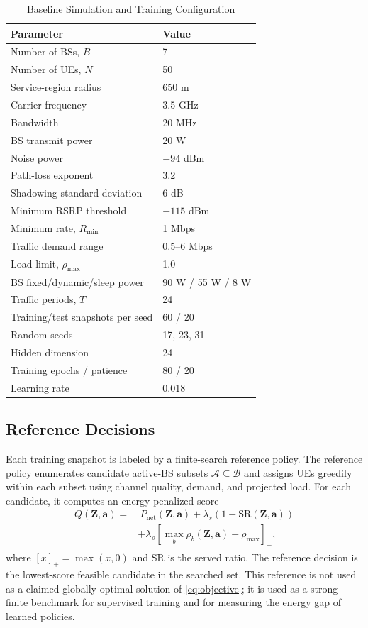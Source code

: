 \documentclass[journal]{IEEEtran}
\begin{document}
\begin{table}[!t]
\caption{Baseline Simulation and Training Configuration}
\label{tab:sim_params}
\centering
\begin{tabular}{ll}
\toprule
Parameter & Value \\
\midrule
Number of BSs, $B$ & 7 \\
Number of UEs, $N$ & 50 \\
Service-region radius & 650 m \\
Carrier frequency & 3.5 GHz \\
Bandwidth & 20 MHz \\
BS transmit power & 20 W \\
Noise power & $-94$ dBm \\
Path-loss exponent & 3.2 \\
Shadowing standard deviation & 6 dB \\
Minimum RSRP threshold & $-115$ dBm \\
Minimum rate, $R_{\min}$ & 1 Mbps \\
Traffic demand range & 0.5--6 Mbps \\
Load limit, $\rho_{\max}$ & 1.0 \\
BS fixed/dynamic/sleep power & 90 W / 55 W / 8 W \\
Traffic periods, $T$ & 24 \\
Training/test snapshots per seed & 60 / 20 \\
Random seeds & 17, 23, 31 \\
Hidden dimension & 24 \\
Training epochs / patience & 80 / 20 \\
Learning rate & 0.018 \\
\bottomrule
\end{tabular}
\end{table}

\subsection{Reference Decisions}
Each training snapshot is labeled by a finite-search reference policy. The
reference policy enumerates candidate active-BS subsets
$\mathcal{A}\subseteq\mathcal{B}$ and assigns UEs greedily within each subset
using channel quality, demand, and projected load. For each candidate, it
computes an energy-penalized score
\begin{align}
    Q(\mathbf{Z},\mathbf{a})
    =&\ P_{\mathrm{net}}(\mathbf{Z},\mathbf{a})
    +\lambda_s\left(1-\mathrm{SR}(\mathbf{Z},\mathbf{a})\right) \nonumber\\
    &+\lambda_{\rho}
    \left[\max_b \rho_b(\mathbf{Z},\mathbf{a})-\rho_{\max}\right]_+,
    \label{eq:reference_score}
\end{align}
where $[x]_+=\max(x,0)$ and $\mathrm{SR}$ is the served ratio. The reference
decision is the lowest-score feasible candidate in the searched set. This
reference is not used as a claimed globally optimal solution of
\eqref{eq:objective}; it is used as a strong finite benchmark for supervised
training and for measuring the energy gap of learned policies.
\end{document}
